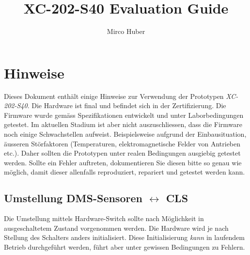 \documentclass[12pt,a4paper]{article}
\author{Mirco Huber}
\title{XC-202-S40 Evaluation Guide}
\newcommand{\subtitle}{Ausmessung Prototypen}
\begin{document}
%
	\pagestyle{fancy}
	
	
	
	\section*{Hinweise}
	Dieses Dokument enthält einige Hinweise zur Verwendung der Prototypen \textit{XC-202-S40}. Die Hardware ist final und befindet sich in der Zertifizierung. Die Firmware wurde gemäss Spezifikationen entwickelt und unter Laborbedingungen getestet. Im aktuellen Stadium ist aber nicht auszuschliessen, dass die Firmware noch einige Schwachstellen aufweist. Beispielsweise aufgrund der Einbausituation, äusseren Störfaktoren (Temperaturen, elektromagnetische Felder von Antrieben etc.). Daher sollten die Prototypen unter realen Bedingungen ausgiebig getestet werden. Sollte ein Fehler auftreten, dokumentieren Sie diesen bitte so genau wie möglich, damit dieser allenfalls reproduziert, repariert und getestet werden kann.
	\subsection*{Umstellung DMS-Sensoren $\leftrightarrow$ CLS}
	Die Umstellung mittels Hardware-Switch sollte nach Möglichkeit in ausgeschaltetem Zustand vorgenommen werden. Die Hardware wird je nach Stellung des Schalters anders initialisiert. Diese Initialisierung \textit{kann} in laufendem Betrieb durchgeführt werden, führt aber unter gewissen Bedingungen zu Fehlern.
\end{document}
